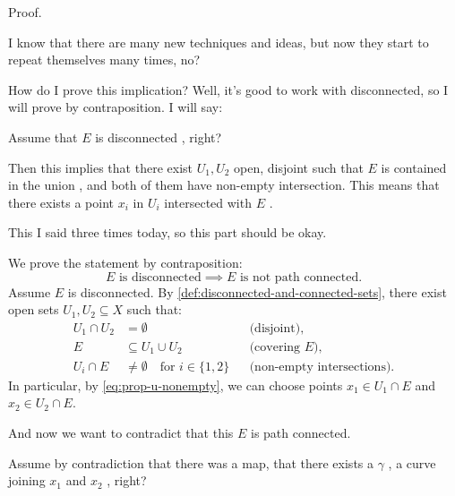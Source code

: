 \begin{proofWrapper}

\begin{speech}[00:39:05 - 00:40:24]
Proof.

I know that there are many new techniques and ideas, but now they start to repeat themselves many times, no?

How do I prove this implication? Well, it's good to work with disconnected, so I will prove by contraposition. I will say:

Assume that $E$ is disconnected , right?

Then this implies that there exist $U_1, U_2$ open, disjoint  such that $E$ is contained in the union , and both of them have non-empty intersection. This means that there exists a point $x_i$ in $U_i$ intersected with $E$ .

This I said three times today, so this part should be okay.
\end{speech}

\begin{content}
We prove the statement by contraposition:
\[
E \text{ is disconnected} \implies E \text{ is not path connected}.
\]
Assume $E$ is disconnected. By \cref{def:disconnected-and-connected-sets}, there exist open sets $U_1, U_2 \subseteq X$ such that:
\begin{align}
U_1 \cap U_2 &= \emptyset && \text{(disjoint),} \label{eq:prop-u-disjoint} \\
E &\subseteq U_1 \cup U_2 && \text{(covering $E$),} \label{eq:prop-u-cover} \\
U_i \cap E &\neq \emptyset \quad \text{for } i \in \{1, 2\} && \text{(non-empty intersections).} \label{eq:prop-u-nonempty}
\end{align}
In particular, by \eqref{eq:prop-u-nonempty}, we can choose points $x_1 \in U_1 \cap E$ and $x_2 \in U_2 \cap E$.
\end{content}

\begin{speech}[00:40:24 - 00:41:35]
And now we want to contradict that this $E$ is path connected.

Assume by contradiction  that there was a map, that there exists a $\gamma$ , a curve joining $x_1$ and $x_2$ , right?


\end{speech}
\end{proofWrapper}
